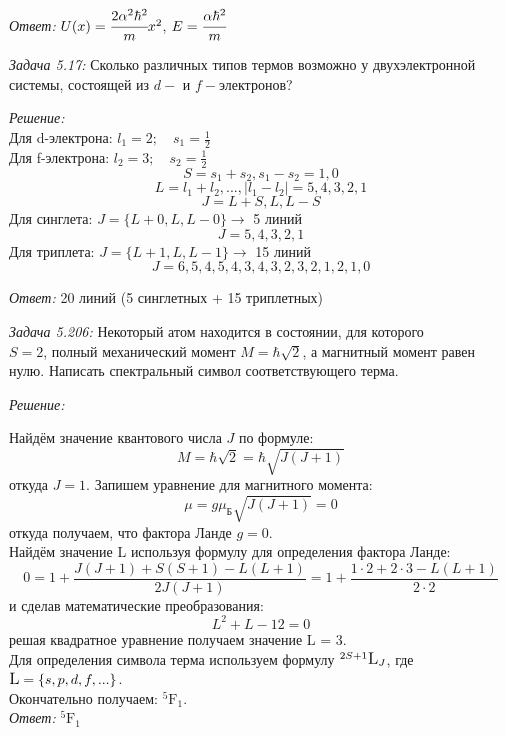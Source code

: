 \emph{Ответ:} \( U(x) = \cfrac{2\alpha^2\hbar^2}{m}x^2 \), 
	\(E = \cfrac{\alpha\hbar^2}{m} \)

\newpage


\emph{Задача 5.17:}
Сколько различных типов термов возможно у двухэлектронной системы, состоящей из
\( d- \) и \( f- \)электронов?

\emph{Решение:}\\
Для d-электрона: \( l_1 = 2;\quad s_1 = \frac{1}{2} \) \\
Для f-электрона: \( l_2 = 3;\quad s_2 = \frac{1}{2} \) \\
	\[ S = s_1 + s_2, s_1 - s_2 = 1, 0 \]
	\[ L = l_1 + l_2, ..., |l_1 - l_2| = 5, 4, 3, 2, 1 \]
	\[ J = L+S, L, L-S \]
Для синглета: \( J = \{ L+0, L, L-0 \} \rightarrow \) 5 линий
\[ J = 5, 4, 3, 2, 1 \]
Для триплета: \( J = \{ L+1, L, L-1 \} \rightarrow \) 15 линий
\[ J = 6, 5, 4, 5, 4, 3, 4, 3, 2, 3, 2, 1, 2, 1, 0 \]

\emph{Ответ:} 20 линий (5 синглетных + 15 триплетных)

\newpage


\emph{Задача 5.206:}
Некоторый атом находится в состоянии, для которого \\\( S = 2 \), полный 
механический момент \( M = \hbar\sqrt{2} \), а магнитный момент равен нулю. 
Написать спектральный символ соответствующего терма.

\emph{Решение:}

Найдём значение квантового числа \( J \) по формуле:
	\[ M = \hbar\sqrt{2} = \hbar\sqrt{J(J+1)} \]
откуда \( J = 1 \). Запишем уравнение для магнитного момента:
	\[ \mu = g\mu_{\text{Б}}\sqrt{J(J+1)} = 0\]
откуда получаем, что фактора Ланде \( g = 0 \). \\
Найдём значение L используя формулу для определения фактора Ланде:
	\[ 
		0 = 1 + \frac{J(J+1)+S(S+1)-L(L+1)}{2J(J+1)} =
		1 + \frac{1\cdot2+2\cdot3-L(L+1)}{2\cdot2} 
	\]
и сделав математические преобразования:
	\[ L^2+L - 12 =0 \]
решая квадратное уравнение получаем значение L = 3. \\
Для определения символа терма используем формулу 
\( ^{2S+1}\large{\text{L}}_{J} \),
где \(\large{\text{L}} = \{s, p, d, f, ...\} \). \\
Окончательно получаем: \( ^{5}\text{F}_{1} \).\\

\emph{Ответ:} \( ^{5}\text{F}_{1} \)

